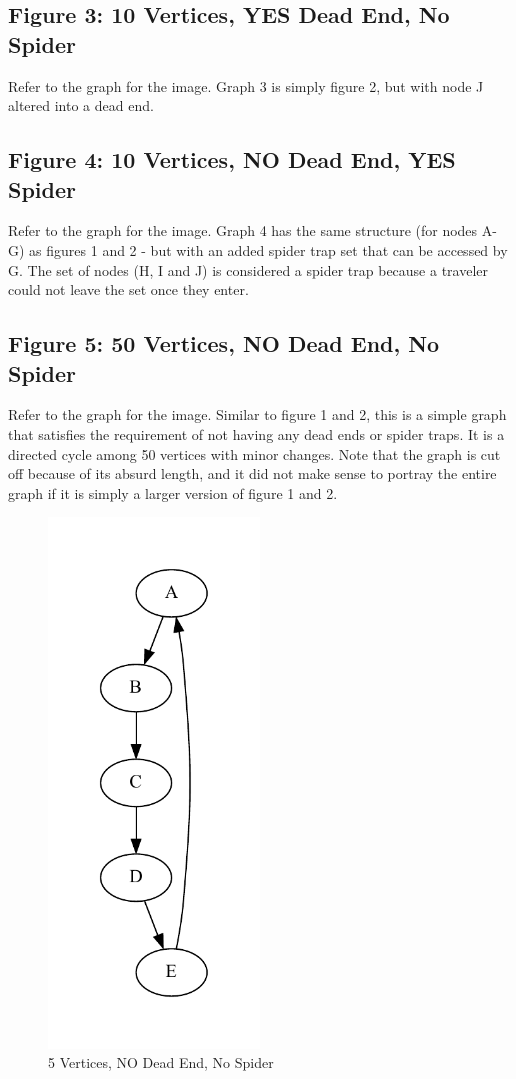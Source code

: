 \documentclass{article}
\begin{document}
\subsection{Figure 3: 10 Vertices, YES Dead End, No Spider}
Refer to the graph for the image. Graph 3 is simply figure 2, but with node J altered into a dead end.
\subsection{Figure 4: 10 Vertices, NO Dead End, YES Spider}
Refer to the graph for the image. Graph 4 has the same structure (for nodes A-G) as figures 1 and 2 - but with an added spider trap set that can be accessed by G. The set of nodes (H, I and J) is considered a spider trap because a traveler could not leave the set once they enter.
\subsection{Figure 5: 50 Vertices, NO Dead End, No Spider}
Refer to the graph for the image. Similar to figure 1 and 2, this is a simple graph that satisfies the requirement of not having any dead ends or spider traps. It is a directed cycle among 50 vertices with minor changes. Note that the graph is cut off because of its absurd length, and it did not make sense to portray the entire graph if it is simply a larger version of figure 1 and 2.

\begin{figure}
  \centering
  \includegraphics[width=0.5\textwidth]{graph1.pdf}
  \caption{5 Vertices, NO Dead End, No Spider}
  \label{fig:image_label}
\end{figure}
\end{document}
